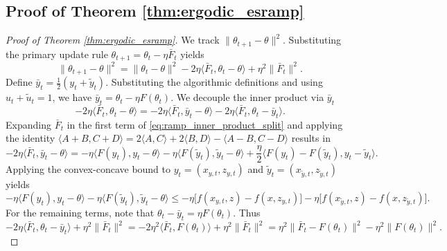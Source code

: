 \documentclass[letter,11pt]{article}
\begin{document}
\subsection{Proof of Theorem \ref{thm:ergodic_esramp}}\label{sec:ergodic_esramp}
\begin{proof}[Proof of Theorem \ref{thm:ergodic_esramp}]
We track $\|\theta_{t+1} - \theta\|^2$. Substituting the primary update rule $\theta_{t+1} = \theta_t - \eta \bar{F}_t$ yields
\begin{equation} \label{eq:ramp_distance_expansion}
\|\theta_{t+1} - \theta\|^2 = \|\theta_t - \theta\|^2 - 2\eta \langle \bar{F}_t, \theta_t - \theta \rangle + \eta^2 \|\bar{F}_t\|^2.
\end{equation}
Define $\bar{y}_t = \frac{1}{2}(y_t + \tilde{y}_t)$. Substituting the algorithmic definitions and using $u_t + \tilde{u}_t = 1$, we have $\bar{y}_t = \theta_t - \eta F(\theta_t)$. We decouple the inner product via $\bar{y}_t$
\begin{equation} \label{eq:ramp_inner_product_split}
-2\eta \langle \bar{F}_t, \theta_t - \theta \rangle = -2\eta \langle \bar{F}_t, \bar{y}_t - \theta \rangle - 2\eta \langle \bar{F}_t, \theta_t - \bar{y}_t \rangle.
\end{equation}
Expanding $\bar{F}_t$ in the first term of \eqref{eq:ramp_inner_product_split} and applying the identity $\langle A+B, C+D \rangle = 2\langle A,C \rangle + 2\langle B,D \rangle - \langle A-B, C-D \rangle$ results in
\begin{equation} \label{eq:ramp_gap_identity}
-2\eta \langle \bar{F}_t, \bar{y}_t - \theta \rangle = -\eta \langle F(y_t), y_t - \theta \rangle - \eta \langle F(\tilde{y}_t), \tilde{y}_t - \theta \rangle + \frac{\eta}{2} \langle F(y_t) - F(\tilde{y}_t), y_t - \tilde{y}_t \rangle.
\end{equation}
Applying the convex-concave bound to $y_t = (x_{y,t}, z_{y,t})$ and $\tilde{y}_t = (x_{\tilde{y},t}, z_{\tilde{y},t})$ yields
\begin{equation} \label{eq:ramp_functional_substitution}
-\eta \langle F(y_t), y_t - \theta \rangle - \eta \langle F(\tilde{y}_t), \tilde{y}_t - \theta \rangle \le -\eta \big[ f(x_{y,t}, z) - f(x, z_{y,t}) \big] - \eta \big[ f(x_{\tilde{y},t}, z) - f(x, z_{\tilde{y},t}) \big].
\end{equation}
For the remaining terms, note that $\theta_t - \bar{y}_t = \eta F(\theta_t)$. Thus
\begin{equation}
-2\eta \langle \bar{F}_t, \theta_t - \bar{y}_t \rangle + \eta^2 \|\bar{F}_t\|^2 = -2\eta^2 \langle \bar{F}_t, F(\theta_t) \rangle + \eta^2 \|\bar{F}_t\|^2 = \eta^2 \|\bar{F}_t - F(\theta_t)\|^2 - \eta^2 \|F(\theta_t)\|^2.

\end{equation}
\end{proof}
\end{document}
